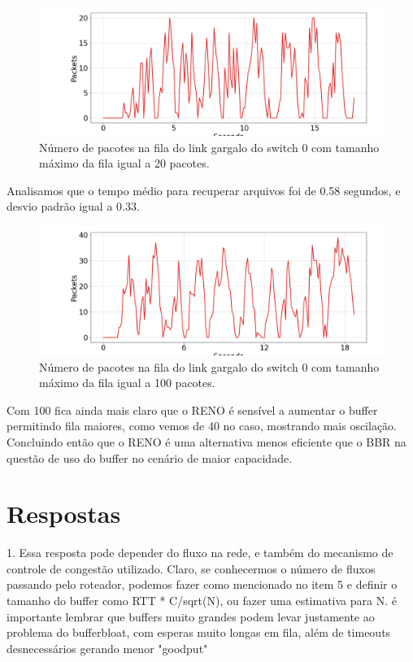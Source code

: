 \documentclass[a4paper,12pt]{article}
\begin{document}
\begin{figure}[ht!]
	\centering
	\includegraphics[width=0.5\columnwidth]{./bufferbloat/bb-q20/reno-part5-buffer-q20.jpg}
	\caption{Número de pacotes na fila do link gargalo do switch 0 com tamanho máximo da fila igual a 20 pacotes.}
\end{figure}



Analisamos que o tempo médio para recuperar arquivos foi de 0.58 segundos, e desvio padrão igual a 0.33.

\begin{figure}[ht!]
	\centering
	\includegraphics[width=0.5\columnwidth]{./bufferbloat/bb-q100/reno-part5-buffer-q100.jpg}
	\caption{Número de pacotes na fila do link gargalo do switch 0 com tamanho máximo da fila igual a 100 pacotes.}
\end{figure}

Com 100 fica ainda mais claro que o RENO é sensível a aumentar o buffer permitindo fila maiores, como vemos de 40 no caso, mostrando mais oscilação. Concluindo então que o RENO é uma alternativa menos eficiente que o BBR na questão de uso do buffer no cenário de maior capacidade.




\section{Respostas}

1. Essa resposta pode depender do fluxo na rede, e também do mecanismo de controle de congestão utilizado. Claro, se conhecermos o número de fluxos passando pelo roteador, podemos fazer como mencionado no item 5 e definir o tamanho do buffer como RTT * C/sqrt(N), ou fazer uma estimativa para N. é importante lembrar que buffers muito grandes podem levar justamente ao problema do bufferbloat, com esperas muito longas em fila, além de timeouts desnecessários gerando menor "goodput"
\end{document}
